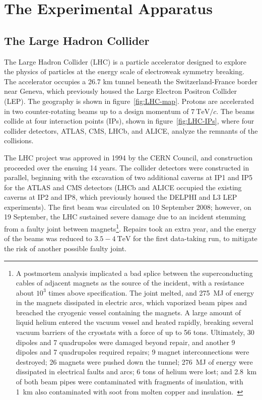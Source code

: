 \chapter{The Experimental Apparatus}
\section{The Large Hadron Collider}
The Large Hadron Collider (LHC) is a particle accelerator designed to explore the physics of particles at the energy scale of electroweak symmetry breaking. The accelerator occupies a 26.7 km tunnel beneath the Switzerland-France border near Geneva, which previously housed the Large Electron Positron Collider (LEP). The geography is shown in figure~\ref{fig:LHC-map}. Protons are accelerated in two counter-rotating beams up to a design momentum of $7~\mbox{TeV}/c$. The beams collide at four interaction points (IPs), shown in figure~\ref{fig:LHC-IPs}, where four collider detectors, ATLAS, CMS, LHCb, and ALICE, analyze the remnants of the collisions.

The LHC project was approved in 1994 by the CERN Council, and construction proceeded over the ensuing 14 years. The collider detectors were constructed in parallel, beginning with the excavation of two additional caverns at IP1 and IP5 for the ATLAS and CMS detectors (LHCb and ALICE occupied the existing caverns at IP2 and IP8, which previously housed the DELPHI and L3 LEP experiments). The first beam was circulated on 10 September 2008; however, on 19 September, the LHC sustained severe damage due to an incident stemming from a faulty joint between magnets\footnote{A postmortem analysis implicated a bad splice between the superconducting cables of adjacent magnets as the source of the incident, with a resistance about $10^3$ times above specification. The joint melted, and 275~MJ of energy in the magnets dissipated in electric arcs, which vaporized beam pipes and breached the cryogenic vessel containing the magnets. A large amount of liquid helium entered the vacuum vessel and heated rapidly, breaking several vacuum barriers of the cryostats with a force of up to 56 tons. Ultimately, 30 dipoles and 7 quadrupoles were damaged beyond repair, and another 9 dipoles and 7 quadrupoles required repairs; 9 magnet interconnections were destroyed; 26 magnets were pushed down the tunnel; 276~MJ of energy were dissipated in electrical faults and arcs; 6 tons of helium were lost; and 2.8~km of both beam pipes were contaminated with fragments of insulation, with 1~km also contaminated with soot from molten copper and insulation.~\cite{Rossi:2010el}}. Repairs took an extra year, and the energy of the beams was reduced to $3.5-4~\mbox{TeV}$ for the first data-taking run, to mitigate the risk of another possible faulty joint. 

